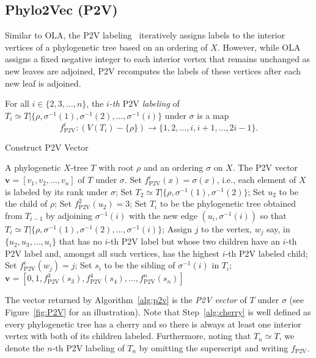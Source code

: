 \documentclass{article}
\newcommand{\PV}{\mathrm{P2V}}
\begin{document}
\subsection{Phylo2Vec (P2V)} \label{sec:P2V}
Similar to OLA, the P2V labeling~\cite{penn2024phylo2vec,scheidwasser2025phylo2vec} iteratively assigns labels to the interior vertices of a phylogenetic tree based on an ordering of $X$. However, while OLA assigns a fixed negative integer to each interior vertex that remains unchanged as new leaves are adjoined, P2V recomputes the labels of these vertices after each new leaf is adjoined.

For all $i\in \{2, 3, \ldots, n\}$, the {\em $i$-th $\PV$ labeling} of $T_i\simeq T|\{\rho, \sigma^{-1}(1), \sigma^{-1}(2), \ldots, \sigma^{-1}(i)\}$ under $\sigma$ is a map 
$$f^i_\PV: (V(T_i)-\{\rho\}) \rightarrow \{1, 2, \ldots, i, i+1, \ldots, 2i-1\}.$$

\begin{algorithm}[H]
\caption{{\sc Construct P2V Vector}}
\begin{algorithmic}[1]
 A phylogenetic $X$-tree $T$ with root $\rho$ and an ordering $\sigma$ on $X$.
 The P2V vector $\mathbf{v}=[v_1, v_2, \ldots, v_n]$ of $T$ under $\sigma$.
\STATE Set $f^i_\PV(x) = \sigma(x)$, i.e., each element of $X$ is labeled by its rank under $\sigma$;
\ENDFOR
\STATE Set $T_2\simeq T|\{\rho,\sigma^{-1}(1),\sigma^{-1}(2)\}$;
\STATE Set $u_2$ to be the child of $\rho$;
\STATE Set $f^2_\PV(u_2)=3$;
\STATE Set $T_i$ to be the phylogenetic tree obtained from $T_{i-1}$ by adjoining $\sigma^{-1}(i)$ with the new edge $(u_i, \sigma^{-1}(i))$ so that $T_i\simeq T|\{\rho, \sigma^{-1}(1), \sigma^{-1}(2), \ldots, \sigma^{-1}(i)\}$;
\STATE\label{alg:cherry} Assign $j$ to the vertex, $w_j$ say, in $\{u_2, u_3, \ldots, u_i\}$ that has no $i$-th P2V label but whose two children have an $i$-th P2V label and, amongst all such vertices, has the highest $i$-th P2V labeled child;
\STATE Set $f^i_\PV(w_j)=j$;
\ENDFOR
\STATE Set $s_i$ to be the sibling of $\sigma^{-1}(i)$ in $T_i$;
\ENDFOR
\RETURN $\mathbf{v}=[0, 1, f^3_\PV(s_3), f^4_\PV(s_4), \ldots, f^n_\PV(s_n)]$
\end{algorithmic}
\label{alg:p2v}
\end{algorithm}


\noindent The vector returned by Algorithm~\ref{alg:p2v} is the {\em P2V vector} of $T$ under $\sigma$ (see Figure~\ref{fig:P2V} for an illustration). Note that Step~\ref{alg:cherry} is well defined as every phylogenetic tree has a cherry and so there is always at least one interior vertex with both of its children labeled. Furthermore, noting that $T_n\simeq T$, we denote the $n$-th P2V labeling of $T_n$ by omitting the superscript and writing $f_\PV$.
\end{document}

